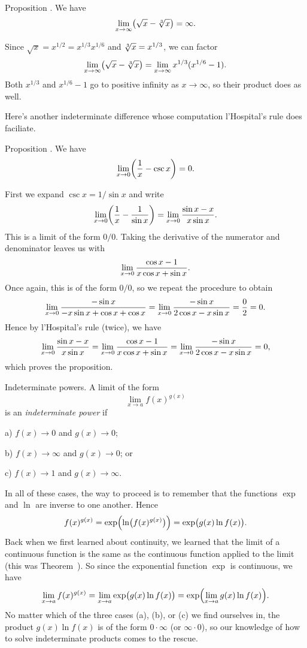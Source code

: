 \proclaim Proposition \advthm. We have
$$\lim_{x\to \infty} \bigl(\sqrt x - \root 3\of x\bigr) = \infty.$$

\proof Since $\sqrt x = x^{1/2} = x^{1/3}x^{1/6}$ and $\root 3\of x = x^{1/3}$, we can factor
$$\lim_{x\to \infty} \bigl( \sqrt x - \root 3\of x\bigr)
= \lim_{x\to \infty} x^{1/3}(x^{1/6} - 1).$$
Both $x^{1/3}$ and $x^{1/6}-1$ go to positive infinity as $x\to \infty$, so their product does as well.\slug

Here's another indeterminate difference whose computation l'Hospital's rule does faciliate.

\proclaim Proposition \advthm. We have
$$\lim_{x\to 0} \biggl({1\over x} - \csc x\biggr) = 0.$$

\proof First we expand $\csc x = 1/\sin x$ and write
$$\lim_{x\to 0} \biggl({1\over x} - {1\over \sin x}\biggr)
= \lim_{x\to 0} {\sin x - x\over x\sin x}.$$
This is a limit of the form $0/0$. Taking the derivative of the numerator and denominator leaves us with
$$\lim_{x\to 0} {\cos x - 1\over x\cos x + \sin x}.$$
Once again, this is of the form $0/0$, so we repeat the procedure to obtain
$$\lim_{x\to 0} {-\sin x \over -x\sin x + \cos x + \cos x} = \lim_{x\to 0} {-\sin x\over 2\cos x - x\sin x}
= {0\over 2} = 0.$$
Hence by l'Hospital's rule (twice), we have
$$\lim_{x\to 0} {\sin x - x\over x\sin x} = \lim_{x\to 0} {\cos x - 1\over x\cos x + \sin x}
= \lim_{x\to 0} {-\sin x\over 2\cos x - x\sin x} = 0,$$
which proves the proposition.\slug

\medskip\boldlabel Indeterminate powers. A limit of the form
$$\lim_{x\to a} f(x)^{g(x)}$$
is an {\it indeterminate power} if
\medskip
\item{a)} $f(x)\to 0$ and $g(x)\to 0$;
\smallskip
\item{b)} $f(x)\to \infty$ and $g(x)\to 0$; or
\smallskip
\item{c)} $f(x)\to 1$ and $g(x)\to \infty$.
\medskip

In all of these cases, the way to proceed is to remember that the functions $\exp$ and $\ln$ are
inverse to one another. Hence
$$f(x)^{g(x)} = \exp\Bigl( \ln \bigl( f(x)^{g(x)} \bigr)\Bigr)
= \exp\bigl( g(x)\ln f(x)\bigr).$$
Back when we first learned about continuity, we learned that the limit of a continuous function is
the same as the continuous function applied to the limit (this was Theorem~{\thmlimcontinterchange}).
So since the exponential function $\exp$ is continuous, we have
$$\lim_{x\to a} f(x)^{g(x)} =
\lim_{x\to a} \exp\bigl( g(x)\ln f(x)\bigr) = \exp \Bigl( \lim_{x\to a} g(x)\ln f(x) \Bigr).$$
No matter which of the three cases (a), (b), or (c) we find ourselves in, the
product $g(x)\ln f(x)$ is of the form $0\cdot\infty$ (or $\infty\cdot 0$),
so our knowledge of how to solve indeterminate
products comes to the rescue.


